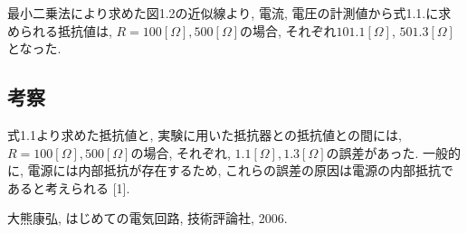 \documentclass[a4paper,10pt]{jsarticle}
\begin{document}
			最小二乗法により求めた図1.2の近似線より,  電流,  電圧の計測値から式1.1.に求められる抵抗値は,  $ R = 100[\Omega], 500 [\Omega] $の場合, それぞれ$101.1[\Omega]$,  $501.3[\Omega]$となった.
			\subsection{考察}
			式1.1より求めた抵抗値と,  実験に用いた抵抗器との抵抗値との間には,  $ R = 100[\Omega], 500[\Omega]$の場合,  それぞれ, $1.1[\Omega], 1.3[\Omega]$の誤差があった.  一般的に, 電源には内部抵抗が存在するため,  これらの誤差の原因は電源の内部抵抗であると考えられる [1].  
			
			
			\begin{thebibliography}{9}
			 大熊康弘,  はじめての電気回路,  技術評論社,  2006.
			\end{thebibliography}
\end{document}

